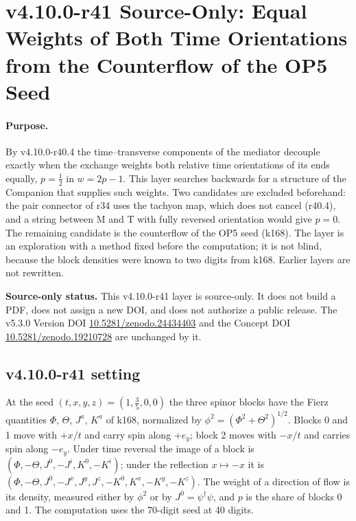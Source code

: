 \clearpage
\section*{v4.10.0-r41 Source-Only: Equal Weights of Both Time Orientations from the Counterflow of the OP5 Seed}
\label{sec:v4100-r41-counterflow-orientation}

\paragraph{Purpose.}
By v4.10.0-r40.4 the time--transverse components of the mediator decouple exactly when the exchange weights both relative time
orientations of its ends equally, \(p=\tfrac12\) in \(w=2p-1\).  This layer searches backwards for a structure of the Companion that supplies
such weights.  Two candidates are excluded beforehand: the pair connector of r34 uses the tachyon map, which does not cancel (r40.4), and a
string between M and T with fully reversed orientation would give \(p=0\).  The remaining candidate is the counterflow of the OP5 seed (k168).
The layer is an exploration with a method fixed before the computation; it is not blind, because the block densities were known to two
digits from k168.  Earlier layers are not rewritten.

\noindent\textbf{Source-only status.}
This v4.10.0-r41 layer is source-only.  It does not build a PDF, does not assign a new DOI,
and does not authorize a public release.  The v5.3.0 Version DOI
\href{https://doi.org/10.5281/zenodo.24434403}{10.5281/zenodo.24434403} and the Concept DOI
\href{https://doi.org/10.5281/zenodo.19210728}{10.5281/zenodo.19210728} are unchanged by it.

\subsection*{v4.10.0-r41 setting}
\label{subsec:v4100-r41-setting}

At the seed \((t,x,y,z)=(1,\tfrac35,0,0)\) the three spinor blocks have the Fierz quantities \(\Phi\), \(\Theta\), \(J^a\), \(K^a\) of k168, normalized by
\(\phi^2=(\Phi^2+\Theta^2)^{1/2}\).  Blocks 0 and 1 move with \(+x/t\) and carry spin along \(+e_y\); block 2 moves with \(-x/t\) and carries spin along \(-e_y\).
Under time reversal the image of a block is \((\Phi,-\Theta,J^0,-J^i,K^0,-K^i)\); under the reflection \(x\mapsto-x\) it is
\((\Phi,-\Theta,J^0,-J^x,J^y,J^z,-K^0,K^x,-K^y,-K^z)\).  The weight of a direction of flow is its density, measured either by \(\phi^2\) or by
\(J^0=\psi^\dagger\psi\), and \(p\) is the share of blocks 0 and 1.  The computation uses the 70-digit seed at 40 digits.

